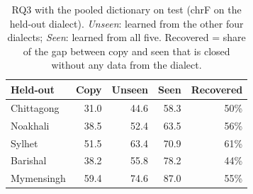 \begin{table}[t]\centering\small
\begin{tabular}{@{}lrrrr@{}}\toprule
Held-out & Copy & Unseen & Seen & Recovered\\\midrule
Chittagong & 31.0 & 44.6 & 58.3 & 50\%\\
Noakhali & 38.5 & 52.4 & 63.5 & 56\%\\
Sylhet & 51.5 & 63.4 & 70.9 & 61\%\\
Barishal & 38.2 & 55.8 & 78.2 & 44\%\\
Mymensingh & 59.4 & 74.6 & 87.0 & 55\%\\
\bottomrule\end{tabular}
\caption{RQ3 with the pooled dictionary on test (chrF on the held-out dialect). \emph{Unseen}: learned from the other four dialects; \emph{Seen}: learned from all five. Recovered = share of the gap between copy and seen that is closed without any data from the dialect.}\label{tab:lodo}
\end{table}

